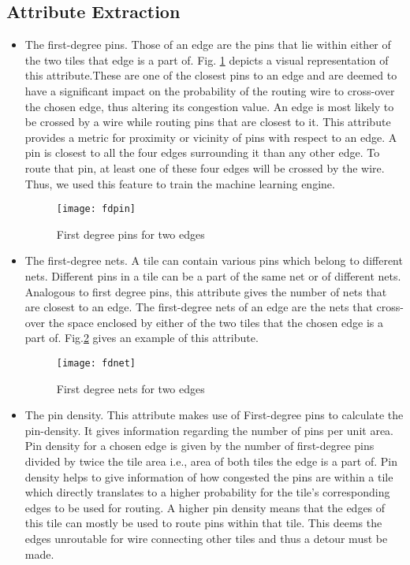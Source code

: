 \subsection{Attribute Extraction}
\begin{itemize}
\item The first-degree pins. Those of an edge are the pins that lie within either of the two tiles that edge is a part of. Fig. \ref{fig:fdpin} depicts a visual representation of this attribute.These are one of the closest pins to an edge and are deemed to have a significant impact on the probability of the routing wire to cross-over the chosen edge, thus altering its congestion value. An edge is most likely to be crossed by a wire while routing pins that are closest to it. This attribute provides a metric for proximity or vicinity of pins with respect to an edge. A pin is closest to all the four edges surrounding it than any other edge. To route that pin, at least one of these four edges will be crossed by the wire. Thus, we used this feature to train the machine learning engine.
\begin{figure}[htbp]
	\centerline{\texttt{[image: fdpin]}}
	\caption{First degree pins for two edges}
	\label{fig:fdpin}
\end{figure}

\item The first-degree nets. A tile can contain various pins which belong to different nets. Different pins in a tile can be a part of the same net or of different nets. Analogous to first degree pins, this attribute gives the number of nets that are closest to an edge. The first-degree nets of an edge are the nets that cross-over the space enclosed by either of the two tiles that the chosen edge is a part of. Fig.\ref{fig:fdnet}  gives an example of this attribute.
\begin{figure}[htbp]
	\centerline{\texttt{[image: fdnet]}}
	\caption{First degree nets for two edges}
	\label{fig:fdnet}
\end{figure}

\item The pin density. This attribute makes use of First-degree pins to calculate the pin-density. It gives information regarding the number of pins per unit area. Pin density for a chosen edge is given by the number of first-degree pins divided by twice the tile area i.e., area of both tiles the edge is a part of. Pin density helps to give information of how congested the pins are within a tile which directly translates to a higher probability for the tile's corresponding edges to be used for routing. A higher pin density means that the edges of this tile can mostly be used to route pins within that tile. This deems the edges unroutable for wire connecting other tiles and thus a detour must be made. 


\end{itemize}
